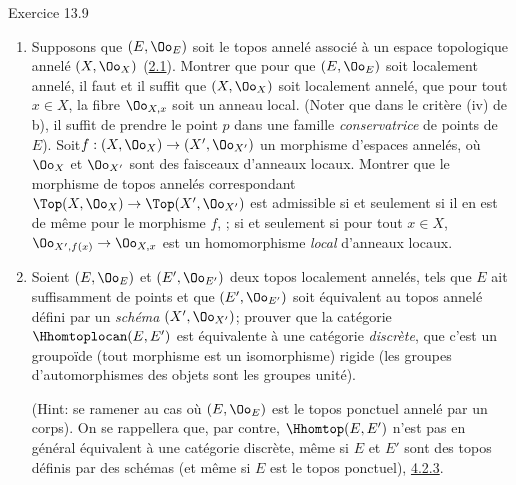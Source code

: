 \documentclass[10pt]{../fichiers-configuration-latex/smfart}
\begin{document}
\begin{enonce*}[remark]{Exercice 13.9}
\begin{enumerate}
\begin{enumerate}
\item Pour tout point $p$ de $E$, posant $p'=f(p)$, l'homomorphisme
naturel sur les fibres
$$
{\Oo}_{E',p'}\longrightarrow {\Oo}_{E,p}
$$
est un homomorphisme \emph{local} d'anneaux locaux.
\end{enumerate}

Lorsque la condition (i) est satisfaite, on dira que $f$ est un
\emph{morphisme de topos localement annelés}, ou encore un
\emph{morphisme admissible de topos localement annelés} si une
confusion est à craindre. On désigne par $\Hhomtoplocan(E,E')$ la
sous-catégorie pleine de la catégorie $\Hhomtopan(E,E')$ de tous les
morphismes de topos annelés de $E$ dans $E'$ définie par les
morphismes admissibles de $E$ dans $E'$.

\item Supposons que $(E,{\Oo}_E)$ soit le topos annelé
  associé à un
espace topologique annelé $(X,{\Oo}_X)$ (\hyperref[IV.subsec2.1]{2.1}).
Montrer que pour que $(E,{\Oo}_E)$ soit localement annelé, il
faut et il suffit que $(X,{\Oo}_X)$ soit localement annelé, \ie
que pour tout $x\in X$, la fibre ${\Oo}_{X,x}$ soit un anneau
local. (Noter que dans le critère (iv) de b), il suffit de prendre
le point $p$ dans une famille \emph{conservatrice} de points de
$E$). Soit\pageoriginale $f:(X,{\Oo}_X)\rightarrow (X',
{\Oo}_{X'})$ un morphisme d'espaces annelés, où ${\Oo}_X$ et
${\Oo}_{X'}$ sont des faisceaux d'anneaux locaux. Montrer que le
morphisme de topos annelés correspondant
$\Top(X,{\Oo}_X)\rightarrow \Top(X', {\Oo}_{X'})$ est
admissible si et seulement si il en est de même pour le morphisme
$f$, \ie; si et seulement si pour tout $x\in X$,
${\Oo}_{X',f(x)}\rightarrow {\Oo}_{X,x}$ est un
homomorphisme \emph{local} d'anneaux locaux.

\item Soient $(E,{\Oo}_E)$ et $(E',{\Oo}_{E'})$ deux topos localement
annelés, tels que $E$ ait suffisamment de points et que
$(E',{\Oo}_{E'})$ soit équivalent au topos annelé défini par un
\emph{schéma} $(X', {\Oo}_{X'})$; prouver que la catégorie
$\Hhomtoplocan(E,E')$ est équivalente à une catégorie
\emph{discrète}, \ie que c'est un groupoïde (tout morphisme est un
isomorphisme) rigide (les groupes d'automorphismes des objets sont
les groupes unité).

\noindent (Hint: se ramener au cas où $(E,{\Oo}_E)$ est le topos
ponctuel annelé par un corps). On se rappellera que, par contre,
$\Hhomtop(E,E')$ n'est pas en général équivalent à une
catégorie
discrète, même si $E$ et $E'$ sont des topos définis par des
schémas
(et même si $E$ est le topos ponctuel), \cf
\hyperref[IV.subsubsec4.2.3]{4.2.3}.


\end{enumerate}
\end{enonce*}
\end{document}
